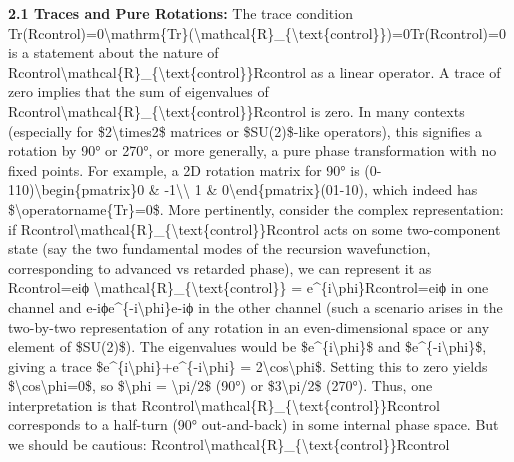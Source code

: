 \documentclass[
]{article}
\begin{document}
\textbf{2.1 Traces and Pure Rotations:} The trace condition
Tr(Rcontrol)=0\textbackslash mathrm\{Tr\}(\textbackslash mathcal\{R\}\_\{\textbackslash text\{control\}\})=0Tr(Rcontrol\hspace{0pt})=0
is a statement about the nature of
Rcontrol\textbackslash mathcal\{R\}\_\{\textbackslash text\{control\}\}Rcontrol\hspace{0pt}
as a linear operator. A trace of zero implies that the sum of
eigenvalues of
Rcontrol\textbackslash mathcal\{R\}\_\{\textbackslash text\{control\}\}Rcontrol\hspace{0pt}
is zero. In many contexts (especially for \$2\textbackslash times2\$
matrices or \$SU(2)\$-like operators), this signifies a rotation by 90°
or 270°, or more generally, a pure phase transformation with no fixed
points. For example, a 2D rotation matrix for 90° is
(0-110)\textbackslash begin\{pmatrix\}0 \&
-1\textbackslash\textbackslash{} 1 \&
0\textbackslash end\{pmatrix\}(01\hspace{0pt}-10\hspace{0pt}), which
indeed has \$\textbackslash operatorname\{Tr\}=0\$. More pertinently,
consider the complex representation: if
Rcontrol\textbackslash mathcal\{R\}\_\{\textbackslash text\{control\}\}Rcontrol\hspace{0pt}
acts on some two-component state (say the two fundamental modes of the
recursion wavefunction, corresponding to advanced vs retarded phase), we
can represent it as Rcontrol=eiϕ
\textbackslash mathcal\{R\}\_\{\textbackslash text\{control\}\} =
e\^{}\{i\textbackslash phi\}Rcontrol\hspace{0pt}=eiϕ in one channel and
e-iϕe\^{}\{-i\textbackslash phi\}e-iϕ in the other channel (such a
scenario arises in the two-by-two representation of any rotation in an
even-dimensional space or any element of \$SU(2)\$). The eigenvalues
would be \$e\^{}\{i\textbackslash phi\}\$ and
\$e\^{}\{-i\textbackslash phi\}\$, giving a trace
\$e\^{}\{i\textbackslash phi\}+e\^{}\{-i\textbackslash phi\} =
2\textbackslash cos\textbackslash phi\$. Setting this to zero yields
\$\textbackslash cos\textbackslash phi=0\$, so \$\textbackslash phi =
\textbackslash pi/2\$ (90°) or \$3\textbackslash pi/2\$ (270°). Thus,
one interpretation is that
Rcontrol\textbackslash mathcal\{R\}\_\{\textbackslash text\{control\}\}Rcontrol\hspace{0pt}
corresponds to a half-turn (90° out-and-back) in some internal phase
space. But we should be cautious:
Rcontrol\textbackslash mathcal\{R\}\_\{\textbackslash text\{control\}\}Rcontrol\hspace{0pt}
\end{document}
